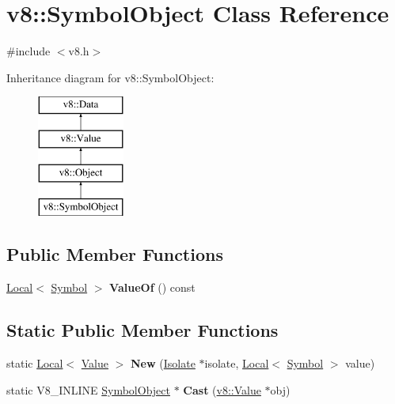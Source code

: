 \hypertarget{classv8_1_1_symbol_object}{}\section{v8\+:\+:Symbol\+Object Class Reference}
\label{classv8_1_1_symbol_object}


{\ttfamily \#include $<$v8.\+h$>$}

Inheritance diagram for v8\+:\+:Symbol\+Object\+:\begin{figure}[H]
\begin{center}
\leavevmode
\includegraphics[height=4.000000cm]{classv8_1_1_symbol_object}
\end{center}
\end{figure}
\subsection*{Public Member Functions}
\begin{DoxyCompactItemize}
\item 
\hyperlink{classv8_1_1_local}{Local}$<$ \hyperlink{classv8_1_1_symbol}{Symbol} $>$ {\bfseries Value\+Of} () const \hypertarget{classv8_1_1_symbol_object_aa547cbfababf548cf07273a30aea9d41}{}\label{classv8_1_1_symbol_object_aa547cbfababf548cf07273a30aea9d41}

\end{DoxyCompactItemize}
\subsection*{Static Public Member Functions}
\begin{DoxyCompactItemize}
\item 
static \hyperlink{classv8_1_1_local}{Local}$<$ \hyperlink{classv8_1_1_value}{Value} $>$ {\bfseries New} (\hyperlink{classv8_1_1_isolate}{Isolate} $\ast$isolate, \hyperlink{classv8_1_1_local}{Local}$<$ \hyperlink{classv8_1_1_symbol}{Symbol} $>$ value)\hypertarget{classv8_1_1_symbol_object_a41f75606c172da650ea61b173f15d4b1}{}\label{classv8_1_1_symbol_object_a41f75606c172da650ea61b173f15d4b1}

\item 
static V8\+\_\+\+I\+N\+L\+I\+NE \hyperlink{classv8_1_1_symbol_object}{Symbol\+Object} $\ast$ {\bfseries Cast} (\hyperlink{classv8_1_1_value}{v8\+::\+Value} $\ast$obj)\hypertarget{classv8_1_1_symbol_object_aa98d7c4211bd55e347ee8169143fcec9}{}\label{classv8_1_1_symbol_object_aa98d7c4211bd55e347ee8169143fcec9}

\end{DoxyCompactItemize}
